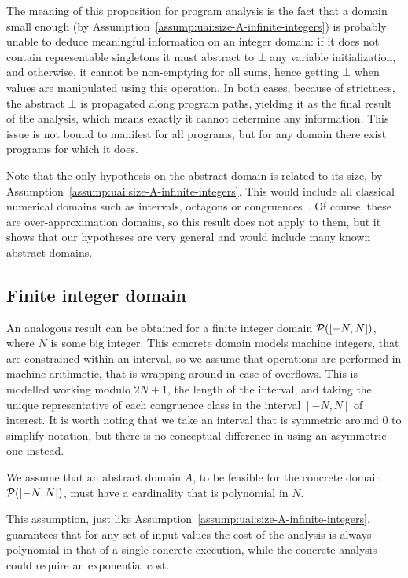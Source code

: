 The meaning of this proposition for program analysis is the fact that a domain small enough (by Assumption~\ref{assump:uai:size-A-infinite-integers}) is probably unable to deduce meaningful information on an integer domain: if it does not contain representable singletons it must abstract to $\bot$ any variable initialization, and otherwise, it cannot be non-emptying for all sums, hence getting $\bot$ when values are manipulated using this operation. In both cases, because of strictness, the abstract $\bot$ is propagated along program paths, yielding it as the final result of the analysis, which means exactly it cannot determine any information. This issue is not bound to manifest for all programs, but for any domain there exist programs for which it does.

Note that the only hypothesis on the abstract domain is related to its size, by Assumption~\ref{assump:uai:size-A-infinite-integers}. This would include all classical numerical domains such as intervals, octagons or congruences~\cite{Granger91}. Of course, these are over-approximation domains, so this result does not apply to them, but it shows that our hypotheses are very general and would include many known abstract domains.

\subsection{Finite integer domain}\label{sec:uai:integers-finite}
An analogous result can be obtained for a finite integer domain $\mathcal{P}([-N, N])$, where $N$ is some big integer. This concrete domain models machine integers, that are constrained within an interval, so we assume that operations are performed in machine arithmetic, that is wrapping around in case of overflows. This is modelled working modulo $2N + 1$, the length of the interval, and taking the unique representative of each congruence class in the interval $[-N, N]$ of interest. It is worth noting that we take an interval that is symmetric around $0$ to simplify notation, but there is no conceptual difference in using an asymmetric one instead.
\begin{assump}\label{assump:uai:size-A-finite-integers}
	We assume that an abstract domain $A$, to be feasible for the concrete domain $\mathcal{P}([-N, N])$, must have a cardinality that is polynomial in $N$.
\end{assump}
This assumption, just like Assumption~\ref{assump:uai:size-A-infinite-integers}, guarantees that for any set of input values the cost of the analysis is always polynomial in that of a single concrete execution, while the concrete analysis could require an exponential cost.

